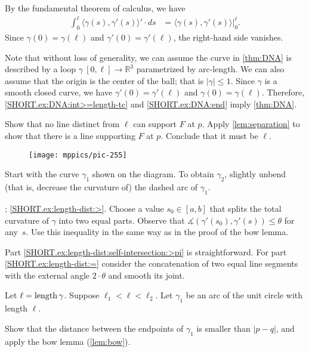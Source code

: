 \begin{multicols}{2}
By the fundamental theorem of calculus, we have
\begin{align*}
\int_0^\ell\langle\gamma(s),\gamma'(s)\rangle'\cdot ds
&=\langle\gamma(s),\gamma'(s)\rangle\bigg|_0^\ell.
\end{align*}
Since $\gamma(0)=\gamma(\ell)$ and $\gamma'(0)=\gamma'(\ell)$, the right-hand side vanishes.


Note that without loss of generality, we can assume the curve in \ref{thm:DNA} is described by a loop $\gamma\:[0,\ell]\to\mathbb{R}^3$ parametrized by arc-length.
We can also assume that the origin is the center of the ball; that is $|\gamma|\le 1$.
Since $\gamma$ is a smooth closed curve, we have 
$\gamma'(0)=\gamma'(\ell)$ and $\gamma(0)=\gamma(\ell)$.
Therefore, \ref{SHORT.ex:DNA:int>=length-tc} and \ref{SHORT.ex:DNA:end} imply \ref{thm:DNA}.

Show that no line distinct from $\ell$ can support $F$ at $p$. 
Apply \ref{lem:separation} to show that there is a line supporting $F$ at $p$.
Conclude that it must be $\ell$.

{

\begin{wrapfigure}{r}{22 mm}
\vskip-6mm
\centering
\texttt{[image: mppics/pic-255]}
\vskip0mm
\end{wrapfigure}

Start with the curve $\gamma_1$ shown on the diagram.
To obtain $\gamma_2$, slightly unbend (that is, decrease the curvature of) the dashed arc of $\gamma_1$.


\parbf{\ref{ex:length-dist}}; \ref{SHORT.ex:length-dist:>}.
Choose a value $s_0\in[a,b]$ that splits the total curvature of $\gamma$ into two equal parts.
Observe that $\measuredangle(\gamma'(s_0),\gamma'(s))\le \theta$ for any~$s$.
Use this inequality in the same way as in the proof of the bow lemma.

Part \ref{SHORT.ex:length-dist:self-intersection:>pi} is straightforward.
For part \ref{SHORT.ex:length-dist:=} consider the concatenation of two equal line segments with the external angle $2\cdot\theta$ and smooth its joint. 


}

Let $\ell=\mathop{\rm length}\nolimits\gamma$.
Suppose $\ell_1<\ell<\ell_2$.
Let $\gamma_1$ be an arc of the unit circle with length $\ell$.

Show that the distance between the endpoints of $\gamma_1$ is smaller than $|p-q|$, and apply the bow lemma (\ref{lem:bow}).



\end{multicols}
